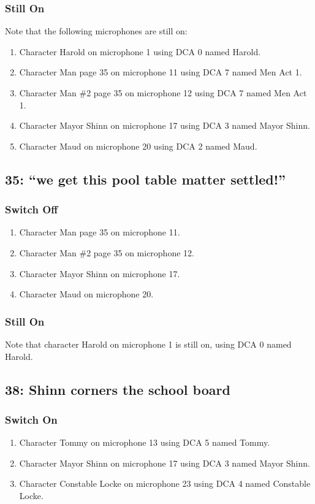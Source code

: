 \subsubsection* {Still On}
Note that the following microphones are still on:
\begin{enumerate}
\item Character Harold on microphone 1 using DCA 0 named Harold.
\item Character Man page 35 on microphone 11 using DCA 7 named Men Act 1.
\item Character Man \#2 page 35 on microphone 12 using DCA 7 named Men Act 1.
\item Character Mayor Shinn on microphone 17 using DCA 3 named Mayor Shinn.
\item Character Maud on microphone 20 using DCA 2 named Maud.
\end{enumerate}
\subsection* {35: ``we get this pool table matter settled!''}
\subsubsection* {Switch Off}
\begin{enumerate}
\item Character Man page 35 on microphone 11.
\item Character Man \#2 page 35 on microphone 12.
\item Character Mayor Shinn on microphone 17.
\item Character Maud on microphone 20.
\end{enumerate}
\subsubsection* {Still On}
Note that character Harold on microphone 1 is still on, using DCA 0 named Harold.\subsection* {38: Shinn corners the school board}
\subsubsection* {Switch On}
\begin{enumerate}
\item Character Tommy on microphone 13 using DCA 5 named Tommy.
\item Character Mayor Shinn on microphone 17 using DCA 3 named Mayor Shinn.
\item Character Constable Locke on microphone 23 using DCA 4 named Constable Locke.
\end{enumerate}
